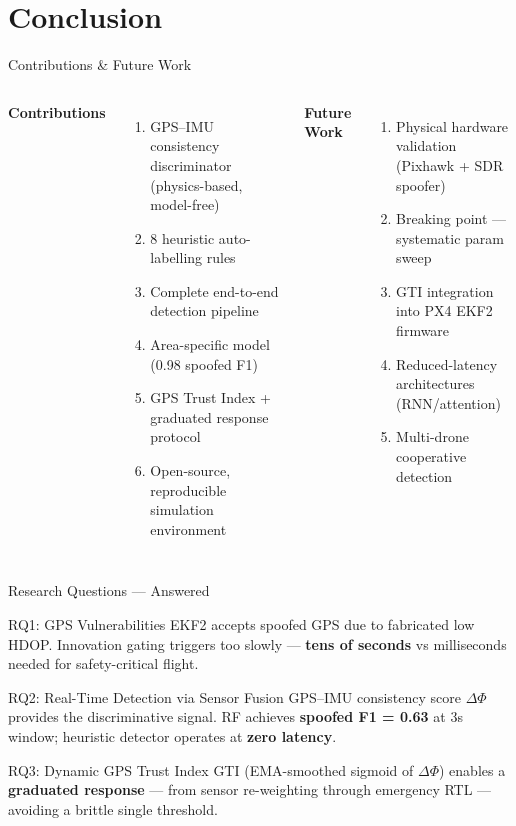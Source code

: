 \documentclass[11pt]{beamer}
\begin{document}
\section{Conclusion}
\begin{frame}{Contributions \& Future Work}
\begin{columns}[T]
\textbf{\small Contributions}
\begin{enumerate}\footnotesize
    \item GPS--IMU consistency discriminator (physics-based, model-free)
    \item 8 heuristic auto-labelling rules
    \item Complete end-to-end detection pipeline
    \item Area-specific model (0.98 spoofed F1)
    \item GPS Trust Index + graduated response protocol
    \item Open-source, reproducible simulation environment
\end{enumerate}
\textbf{\small Future Work}
\begin{enumerate}\footnotesize
    \item Physical hardware validation (Pixhawk + SDR spoofer)
    \item Breaking point — systematic param sweep
    \item GTI integration into PX4 EKF2 firmware
    \item Reduced-latency architectures (RNN/attention)
    \item Multi-drone cooperative detection
\end{enumerate}
\end{columns}
\end{frame}

\begin{frame}{Research Questions — Answered}
\vspace{1mm}
\begin{block}{RQ1: GPS Vulnerabilities}\footnotesize
    EKF2 accepts spoofed GPS due to fabricated low HDOP. Innovation gating triggers too slowly —
    \textbf{tens of seconds} vs milliseconds needed for safety-critical flight.
\end{block}
\vspace{1mm}
\begin{block}{RQ2: Real-Time Detection via Sensor Fusion}\footnotesize
    GPS--IMU consistency score $\Delta\Phi$ provides the discriminative signal.
    RF achieves \textbf{spoofed F1 = 0.63} at 3s window; heuristic detector operates at \textbf{zero latency}.
\end{block}
\vspace{1mm}
\begin{block}{RQ3: Dynamic GPS Trust Index}\footnotesize
    GTI (EMA-smoothed sigmoid of $\Delta\Phi$) enables a \textbf{graduated response} —
    from sensor re-weighting through emergency RTL — avoiding a brittle single threshold.
\end{block}
\end{frame}
\end{document}
